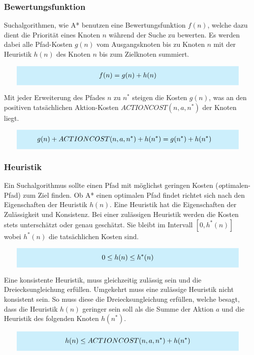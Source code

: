 \subsubsection{Bewertungsfunktion}

Suchalgorithmen, wie A* benutzen eine Bewertungsfunktion $f(n)$, welche dazu dient die Priorität eines Knoten $n$ während der Suche zu bewerten. Es werden dabei alle Pfad-Kosten $g(n)$ vom Ausgangsknoten bis zu Knoten $n$ mit der Heuristik $h(n)$ des Knoten $n$ bis zum Zielknoten summiert.

\[
\highlightbox{0.9\textwidth}{$
    \begin{aligned}
			f(n) = g(n) + h(n)
    \end{aligned}
$}
\]

Mit jeder Erweiterung des Pfades $n$ zu $n^{\ast}$ steigen die Kosten $g(n)$, was an den positiven tatsächlichen Aktion-Kosten $ACTIONCOST(n,a,n^*)$ der Knoten liegt.

\[
\highlightbox{0.9\textwidth}{$
    \begin{aligned}
			g(n) + ACTIONCOST(n,a,n^*) + h(n^*) &= g(n^*) + h(n^*)
    \end{aligned}
$}
\]

\subsubsection{Heuristik}

Ein Suchalgorithmus sollte einen Pfad mit möglichst geringen Kosten (\textit optimalen-Pfad) zum Ziel finden. Ob A* einen optimalen Pfad findet richtet sich nach den Eigenschaften der Heuristik $h(n)$. Eine Heuristik hat die Eigenschaften der Zulässigkeit und Konsistenz.
Bei einer zulässigen Heuristik werden die Kosten stets unterschätzt oder genau geschätzt. Sie bleibt im Intervall $[0, h^{\ast}(n)]$ wobei $h^{\ast}(n)$ die tatsächlichen Kosten sind.

\[
\highlightbox{0.9\textwidth}{$
    \begin{aligned}
			0 \leq h(n) \leq h^*(n)
    \end{aligned}
$}
\]

Eine konsistente Heuristik, muss gleichzeitig zulässig sein und die Dreiecksungleichung erfüllen. Umgekehrt muss eine zulässige Heuristik nicht konsistent sein. So muss diese die Dreiecksungleichung erfüllen, welche besagt, dass die Heuristik $h(n)$ geringer sein soll als die Summe der Aktion $a$ und die Heuristik des folgenden Knoten $h(n^*)$.

\[
\highlightbox{0.9\textwidth}{$
    \begin{aligned}
			h(n) \leq ACTIONCOST(n,a,n^*) + h(n^*)
    \end{aligned}
$}
\]

